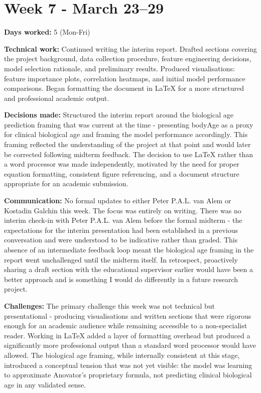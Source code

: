 \documentclass[11pt,a4paper]{article}
\begin{document}
\section{Week 7  -  March 23–29}

\textbf{Days worked:} 5 (Mon-Fri)

\textbf{Technical work:} Continued writing the interim report. Drafted sections covering the project background, data collection procedure, feature engineering decisions, model selection rationale, and preliminary results. Produced visualisations: feature importance plots, correlation heatmaps, and initial model performance comparisons. Began formatting the document in LaTeX for a more structured and professional academic output.

\textbf{Decisions made:} Structured the interim report around the biological age prediction framing that was current at the time  -  presenting bodyAge as a proxy for clinical biological age and framing the model performance accordingly. This framing reflected the understanding of the project at that point and would later be corrected following midterm feedback. The decision to use LaTeX rather than a word processor was made independently, motivated by the need for proper equation formatting, consistent figure referencing, and a document structure appropriate for an academic submission.

\textbf{Communication:} No formal updates to either Peter P.A.L. van Alem or Kostadin Galchin this week. The focus was entirely on writing. There was no interim check-in with Peter P.A.L. van Alem before the formal midterm  -  the expectations for the interim presentation had been established in a previous conversation and were understood to be indicative rather than graded. This absence of an intermediate feedback loop meant the biological age framing in the report went unchallenged until the midterm itself. In retrospect, proactively sharing a draft section with the educational supervisor earlier would have been a better approach and is something I would do differently in a future research project.

\textbf{Challenges:} The primary challenge this week was not technical but presentational  -  producing visualisations and written sections that were rigorous enough for an academic audience while remaining accessible to a non-specialist reader. Working in LaTeX added a layer of formatting overhead but produced a significantly more professional output than a standard word processor would have allowed. The biological age framing, while internally consistent at this stage, introduced a conceptual tension that was not yet visible: the model was learning to approximate Anovator's proprietary formula, not predicting clinical biological age in any validated sense.
\end{document}
